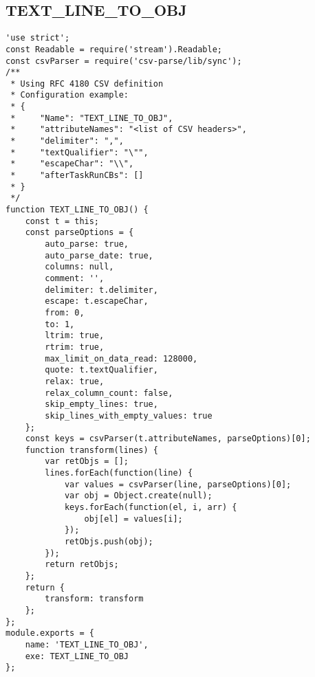 
\subsection{TEXT\_LINE\_TO\_OBJ}
\label{netl-trans-text-line-to-obj}
\begin{verbatim}
'use strict';
const Readable = require('stream').Readable;
const csvParser = require('csv-parse/lib/sync');
/**
 * Using RFC 4180 CSV definition
 * Configuration example:
 * {
 *     "Name": "TEXT_LINE_TO_OBJ",
 *     "attributeNames": "<list of CSV headers>",
 *     "delimiter": ",",
 *     "textQualifier": "\"",
 *     "escapeChar": "\\",
 *     "afterTaskRunCBs": []
 * }
 */
function TEXT_LINE_TO_OBJ() {
    const t = this;
    const parseOptions = {
        auto_parse: true,
        auto_parse_date: true,
        columns: null,
        comment: '',
        delimiter: t.delimiter,
        escape: t.escapeChar,
        from: 0,
        to: 1,
        ltrim: true,
        rtrim: true,
        max_limit_on_data_read: 128000,
        quote: t.textQualifier,
        relax: true,
        relax_column_count: false,
        skip_empty_lines: true,
        skip_lines_with_empty_values: true
    };
    const keys = csvParser(t.attributeNames, parseOptions)[0];
    function transform(lines) {
        var retObjs = [];
        lines.forEach(function(line) {
            var values = csvParser(line, parseOptions)[0];
            var obj = Object.create(null);
            keys.forEach(function(el, i, arr) {
                obj[el] = values[i];
            });
            retObjs.push(obj);
        });
        return retObjs;
    };
    return {
        transform: transform
    };
};
module.exports = {
    name: 'TEXT_LINE_TO_OBJ',
    exe: TEXT_LINE_TO_OBJ
};
\end{verbatim}


